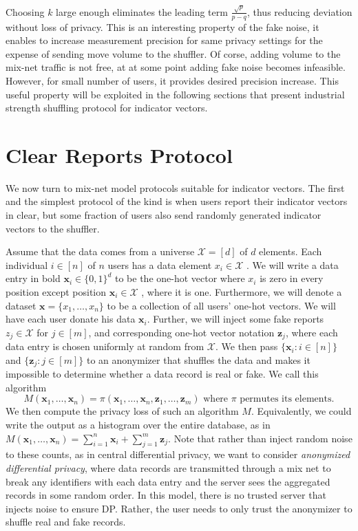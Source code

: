 \documentclass[11pt]{article}
\newcommand{\bbx}{\pmb{x}}
\newcommand{\bbz}{\pmb{z}}
\newcommand{\cX}{\mathcal{X}}
\begin{document}
Choosing $k$ large enough eliminates the leading term  $\frac{\sqrt{p}}{p-q}$, thus reducing deviation without loss of privacy. This is an interesting property of the fake noise, it enables to increase measurement precision for same privacy settings for the expense of sending move volume to the shuffler.  Of corse, adding volume to the mix-net traffic is not free, at at some point adding fake noise becomes infeasible.  However, for small number of users, it provides desired precision increase. This useful property will be exploited in the following sections that present industrial strength shuffling protocol for indicator vectors. 

\section{Clear Reports Protocol}

We now turn to mix-net model protocols suitable for indicator vectors. The first and the simplest protocol of the kind is when users report their indicator vectors in clear, but some fraction of users also send randomly generated indicator vectors to the shuffler. 

Assume that the data comes from a universe $\cX = [d]$ of $d$ elements. Each individual $i \in [n]$ of $n$ users has a data element $x_i\in \cX$ . We will write a data entry in bold $\bbx_i \in \{0, 1\}^d $ to be the one-hot vector where $x_i$ is zero in every position except position $\bbx_i \in \cX$ , where it is one. Furthermore, we will denote a dataset $\bbx = \{x_1,\dots ,x_n\}$ to be a collection of all users' one-hot vectors. We will have each user donate his data $\bbx_i$. Further, we will inject some fake reports $z_j\in \cX$ for $j \in [m]$, and corresponding one-hot vector notation $\bbz_j$, where each data entry is chosen uniformly at random from $\cX$. We then pass $\{\bbx_i : i \in [n]\}$ and $\{\bbz_j : j \in [m]\} $ to an anonymizer that shuffles the data and makes it impossible to determine whether a data record is real or fake. We call this algorithm 
\[
M(\bbx_1,  \dots , \bbx_n) = \pi (\bbx_1, \dots , \bbx_n, \bbz_1, \dots , \bbz_m) \text{ where } \pi \text{ permutes its elements}. 
\]
We then compute the privacy loss of such an algorithm $M$. Equivalently, we could write the output as a histogram over the entire database, as in $M(\bbx_1,  \dots , \bbx_n) = \sum^n_{i=1} \bbx_i + \sum^m_{j=1} \bbz_j$. Note that rather than inject random noise to these counts, as in central differential privacy, we want to consider \emph{anonymized differential privacy}, where data records are transmitted through a mix net to break any identifiers with each data entry and the server sees the aggregated records in some random order. In this model, there is no trusted server that injects noise to ensure DP. Rather, the user needs to only trust the anonymizer to shuffle real and fake records.
\end{document}

